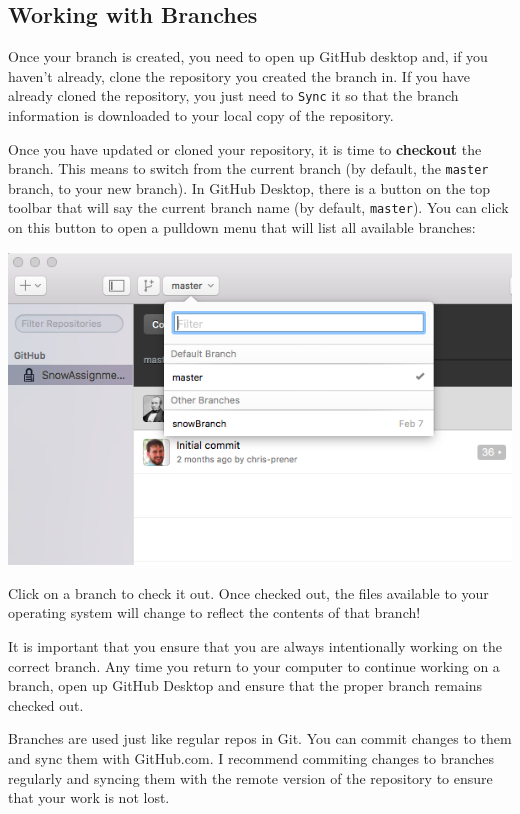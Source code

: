 \documentclass[]{book}
\theoremstyle{definition}
\theoremstyle{definition}
\theoremstyle{remark}
\begin{document}
\subsection{Working with Branches}\label{working-with-branches}

Once your branch is created, you need to open up GitHub desktop and, if
you haven't already, clone the repository you created the branch in. If
you have already cloned the repository, you just need to \texttt{Sync}
it so that the branch information is downloaded to your local copy of
the repository.

Once you have updated or cloned your repository, it is time to
\textbf{checkout} the branch. This means to switch from the current
branch (by default, the \texttt{master} branch, to your new branch). In
GitHub Desktop, there is a button on the top toolbar that will say the
current branch name (by default, \texttt{master}). You can click on this
button to open a pulldown menu that will list all available branches:

\includegraphics[width=1\linewidth]{images/branch3}

Click on a branch to check it out. Once checked out, the files available
to your operating system will change to reflect the contents of that
branch!

It is important that you ensure that you are always intentionally
working on the correct branch. Any time you return to your computer to
continue working on a branch, open up GitHub Desktop and ensure that the
proper branch remains checked out.

Branches are used just like regular repos in Git. You can commit changes
to them and sync them with GitHub.com. I recommend commiting changes to
branches regularly and syncing them with the remote version of the
repository to ensure that your work is not lost.
\end{document}
